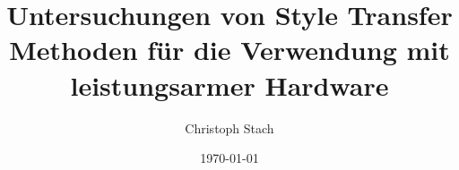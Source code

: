 


\title{Untersuchungen von Style Transfer Methoden für die Verwendung mit leistungsarmer Hardware}
\author{Christoph Stach}

\date{\today}












